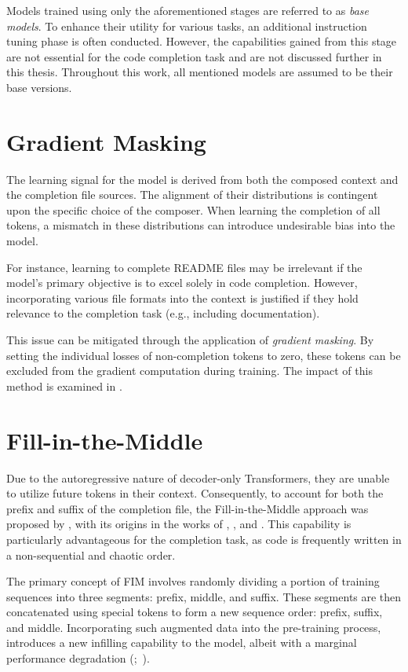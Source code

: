 Models trained using only the aforementioned stages are referred to as \textit{base models}. To enhance their utility for various tasks, an additional instruction tuning phase is often conducted. However, the capabilities gained from this stage are not essential for the code completion task and are not discussed further in this thesis. Throughout this work, all mentioned models are assumed to be their base versions.

\section{Gradient Masking}

The learning signal for the model is derived from both the composed context and the completion file sources. The alignment of their distributions is contingent upon the specific choice of the composer. When learning the completion of all tokens, a mismatch in these distributions can introduce undesirable bias into the model.

For instance, learning to complete README files may be irrelevant if the model's primary objective is to excel solely in code completion. However, incorporating various file formats into the context is justified if they hold relevance to the completion task (e.g., including documentation).

This issue can be mitigated through the application of \textit{gradient masking}. By setting the individual losses of non-completion tokens to zero, these tokens can be excluded from the gradient computation during training. The impact of this method is examined in .

\section{Fill-in-the-Middle}\label{sec:fill-in-the-middle}

Due to the autoregressive nature of decoder-only Transformers, they are unable to utilize future tokens in their context. Consequently, to account for both the prefix and suffix of the completion file, the Fill-in-the-Middle approach was proposed by \citet{bavarian2022}, with its origins in the works of \citet{donahue2020}, \citet{aghajanyan2022}, and \citet{fried2022}. This capability is particularly advantageous for the completion task, as code is frequently written in a non-sequential and chaotic order.

The primary concept of FIM involves randomly dividing a portion of training sequences into three segments: prefix, middle, and suffix. These segments are then concatenated using special tokens to form a new sequence order: prefix, suffix, and middle. Incorporating such augmented data into the pre-training process, introduces a new infilling capability to the model, albeit with a marginal performance degradation (\cite{allal2023};~\cite{rozière2023}).

